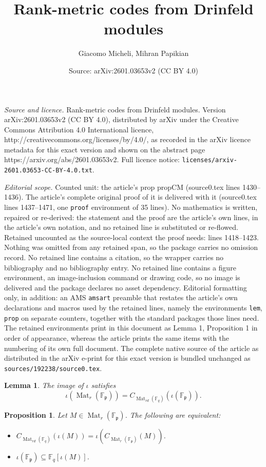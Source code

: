 \documentclass[10pt,a4paper]{amsart}
\title{Rank-metric codes from Drinfeld modules}
\author{Giacomo Micheli, Mihran Papikian}
\date{Source: arXiv:2601.03653v2 (CC BY 4.0)}
\newtheorem{lem}{Lemma}
\newtheorem{prop}{Proposition}
\newcommand{\F}{\mathbb{F}}
\DeclareMathOperator{\Mat}{Mat}
\newcommand{\fp}{\mathfrak{p}}
\begin{document}
\maketitle

\noindent\emph{Source and licence.} Rank-metric codes from Drinfeld modules. Version arXiv:2601.03653v2 (CC BY 4.0), distributed by arXiv under the Creative Commons Attribution 4.0 International licence, http://creativecommons.org/licenses/by/4.0/, as recorded in the arXiv licence metadata for this exact version and shown on the abstract page https://arxiv.org/abs/2601.03653v2. Full licence notice: \texttt{licenses/arxiv-2601.03653-CC-BY-4.0.txt}.\par\smallskip

\noindent\textit{Editorial scope.} Counted unit: the article's prop propCM (source0.tex lines 1430--1436). The article's complete original proof of it is delivered with it (source0.tex lines 1437--1471, one \texttt{proof} environment of 35 lines). No mathematics is written, repaired or re-derived: the statement and the proof are the article's own lines, in the article's own notation, and no retained line is substituted or re-flowed.  Retained uncounted as the source-local context the proof needs: lines 1418--1423.  Nothing was omitted from any retained span, so the package carries no omission record.  No retained line contains a citation, so the wrapper carries no bibliography and no bibliography entry.  No retained line contains a figure environment, an image-inclusion command or drawing code, so no image is delivered and the package declares no asset dependency.  Editorial formatting only, in addition: an AMS \texttt{amsart} preamble that restates the article's own declarations and macros used by the retained lines, namely the environments \texttt{lem}, \texttt{prop} on separate counters, together with the standard packages those lines need.  The retained environments print in this document as Lemma 1, Proposition 1 in order of appearance, whereas the article prints the same items with the numbering of its own full document.  The complete native source of the article as distributed in the arXiv e-print for this exact version is bundled unchanged as \texttt{sources/192238/source0.tex}.
 \begin{lem}\label{lemC(F_p)}
 	The image of $\iota$ satisfies 
 	\[
 	\iota(\Mat_r(\F_\fp)) = C_{\Mat_{rd}(\F_q)}(\iota(\F_\fp)). 
 	\]
 \end{lem}

 \begin{prop}\label{propCM}
 	Let $M\in \Mat_r(\F_\fp)$. The following are equivalent: 
 	\begin{itemize}
 		\item[(i)] $C_{\Mat_{rd}(\F_q)}(\iota(M))=\iota\left(C_{\Mat_r(\F_\fp)}(M)\right)$.
 		\item[(ii)]  $\iota(\F_\fp)\subseteq \F_q[\iota(M)]$. 
 	\end{itemize}
 \end{prop}
\end{document}
